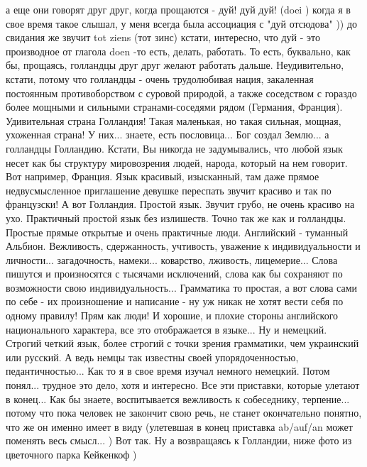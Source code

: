 а еще они говорят друг друг, когда прощаются - дуй! дуй дуй! (doei ) когда я в
свое время такое слышал, у меня всегда была ассоциация с "дуй отсюдова" )) до
свидания же звучит tot ziens (тот зинс) кстати, интересно, что дуй - это
производное от глагола doen -то есть, делать, работать. То есть, буквально, как
бы, прощаясь, голландцы друг друг желают работать дальше. Неудивительно,
кстати, потому что голландцы - очень трудолюбивая нация, закаленная постоянным
противоборством с суровой природой, а также соседством с гораздо более мощными
и сильными странами-соседями рядом (Германия, Франция). Удивительная страна
Голландия! Такая маленькая, но такая сильная, мощная, ухоженная страна! У
них... знаете, есть пословица... Бог создал Землю... а голландцы Голландию.
Кстати, Вы никогда не задумывались, что любой язык несет как бы структуру
мировозрения людей, народа, который на нем говорит. Вот например, Франция. Язык
красивый, изысканный, там даже прямое недвусмысленное приглашение девушке
переспать звучит красиво и так по французски! А вот Голландия. Простой язык.
Звучит грубо, не очень красиво на ухо. Практичный простой язык без излишеств.
Точно так же как и голландцы. Простые прямые открытые и очень практичные люди.
Английский - туманный Альбион. Вежливость, сдержанность, учтивость, уважение к
индивидуальности и личности... загадочность, намеки... коварство, лживость,
лицемерие... Слова пишутся и произносятся с тысячами исключений, слова как бы
сохраняют по возможности свою индивидуальность... Грамматика то простая, а вот
слова сами по себе - их произношение и написание - ну уж никак не хотят вести
себя по одному правилу! Прям как люди! И хорошие, и плохие стороны английского
национального характера, все это отображается в языке... Ну и немецкий. Строгий
четкий язык, более строгий с точки зрения грамматики, чем украинский или
русский. А ведь немцы так известны своей упорядоченностью, педантичностью...
Как то я в свое время изучал немного немецкий. Потом понял... трудное это дело,
хотя и интересно. Все эти приставки, которые улетают в конец... Как бы знаете,
воспитывается вежливость к собеседнику, терпение... потому что пока человек не
закончит свою речь, не станет окончательно понятно, что же он именно имеет в
виду (улетевшая в конец приставка  ab/auf/an может поменять весь смысл... ) Вот
так. Ну а возвращаясь к Голландии, ниже фото из цветочного парка Кейкенкоф )




